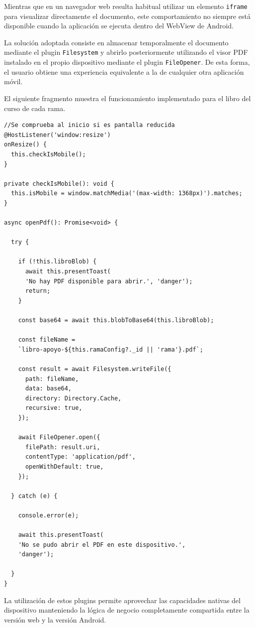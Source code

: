 Mientras que en un navegador web resulta habitual utilizar un elemento \texttt{iframe} para visualizar directamente el documento, este comportamiento no siempre está disponible cuando la aplicación se ejecuta dentro del WebView de Android.

La solución adoptada consiste en almacenar temporalmente el documento mediante el plugin \texttt{Filesystem} y abrirlo posteriormente utilizando el visor PDF instalado en el propio dispositivo mediante el plugin \texttt{FileOpener}. De esta forma, el usuario obtiene una experiencia equivalente a la de cualquier otra aplicación móvil.

El siguiente fragmento muestra el funcionamiento implementado para el libro del curso de cada rama.

\begin{Verbatim}[frame=single, fontsize=\small, xleftmargin=10pt, xrightmargin=10pt]
//Se comprueba al inicio si es pantalla reducida
@HostListener('window:resize')
onResize() {
  this.checkIsMobile();
}

private checkIsMobile(): void {
  this.isMobile = window.matchMedia('(max-width: 1368px)').matches;
}

async openPdf(): Promise<void> {

  try {

    if (!this.libroBlob) {
      await this.presentToast(
      'No hay PDF disponible para abrir.', 'danger');
      return;
    }

    const base64 = await this.blobToBase64(this.libroBlob);

    const fileName =
    `libro-apoyo-${this.ramaConfig?._id || 'rama'}.pdf`;

    const result = await Filesystem.writeFile({
      path: fileName,
      data: base64,
      directory: Directory.Cache,
      recursive: true,
    });

    await FileOpener.open({
      filePath: result.uri,
      contentType: 'application/pdf',
      openWithDefault: true,
    });

  } catch (e) {

    console.error(e);

    await this.presentToast(
    'No se pudo abrir el PDF en este dispositivo.',
    'danger');

  }
}
\end{Verbatim}

La utilización de estos plugins permite aprovechar las capacidades nativas del dispositivo manteniendo la lógica de negocio completamente compartida entre la versión web y la versión Android.

